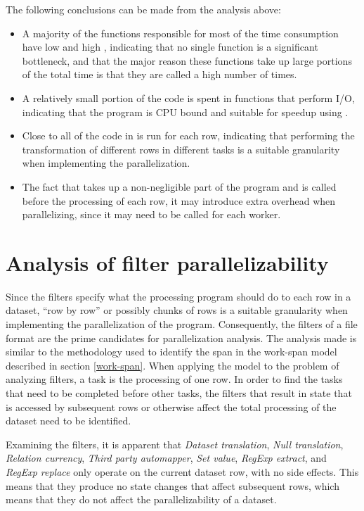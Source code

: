 The following conclusions can be made from the analysis above:

\begin{itemize}
  \item A majority of the functions responsible for most of the time consumption have low  and high , indicating that no single function is
    a significant bottleneck, and that the major reason these functions take up large portions of the total time is that they are called a high number of times.
  \item A relatively small portion of the code is spent in functions that perform I/O, indicating that the program is CPU bound and suitable for speedup using
    .
  \item Close to all of the code in  is run for each row, indicating that performing the transformation of different rows in different tasks is a
    suitable granularity when implementing the parallelization.
  \item The fact that  takes up a non-negligible part of the program and is called before the processing of each row, it may introduce extra overhead
    when parallelizing, since it may need to be called for each worker.
\end{itemize}

\section{Analysis of filter parallelizability}
Since the filters specify what the processing program should do to each row in a dataset, ``row by row'' or possibly chunks of rows is a suitable
granularity when implementing the parallelization of the program. Consequently, the filters of a file format are the prime candidates
for parallelization analysis. The analysis made is similar to the methodology used to identify the span in the work-span model described in
section \ref{work-span}. When applying the model to the problem of analyzing filters, a task is the processing of one row. In order to find
the tasks that need to be completed before other tasks, the filters that result in state that is accessed by subsequent rows or otherwise
affect the total processing of the dataset need to be identified.

Examining the filters, it is apparent that \textit{Dataset translation}, \textit{Null translation}, \textit{Relation currency},
\textit{Third party automapper}, \textit{Set value}, \textit{RegExp extract}, and \textit{RegExp replace} only operate on the current dataset row, with no side effects.
This means that they produce no state changes that affect subsequent rows, which means that they do not affect the parallelizability of a dataset.


